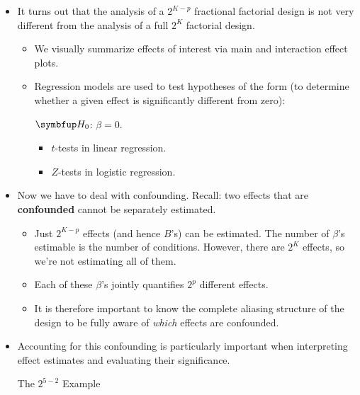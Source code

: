 \begin{itemize}
    \item It turns out that the analysis of a $ 2^{K-p} $ fractional factorial design is not very different from the analysis
          of a full $2^K$ factorial design.
          \begin{itemize}
              \item We visually summarize effects of interest via main and interaction effect plots.
              \item Regression models are used to test hypotheses of the form (to determine whether a given effect is significantly different from zero):
                    \begin{tightcenter}
                        $ \HN $: $ \beta=0 $.
                    \end{tightcenter}
                    \begin{itemize}[$\rightarrow$]
                        \item $ t $-tests in linear regression.
                        \item $ Z $-tests in logistic regression.
                    \end{itemize}
          \end{itemize}
    \item Now we have to deal with confounding. Recall: two effects that are \textbf{confounded} cannot be separately
          estimated.
          \begin{itemize}[$\rightarrow$]
              \item Just $ 2^{K-p} $ effects (and hence $ B $'s) can be estimated. The number of $ \beta $'s estimable is the number of conditions.
                    However, there are $ 2^K $ effects, so we're not estimating all of them.
              \item Each of these $ \beta $'s jointly quantifies $ 2^p $ different effects.
          \end{itemize}
          \begin{itemize}
              \item It is therefore important to know the complete aliasing structure of the design to be fully
                    aware of \emph{which} effects are confounded.
          \end{itemize}
    \item Accounting for this confounding is particularly important when interpreting effect estimates and evaluating their significance.
          \begin{Example}{The $ 2^{5-2} $ Example}{}

\end{Example}
\end{itemize}
